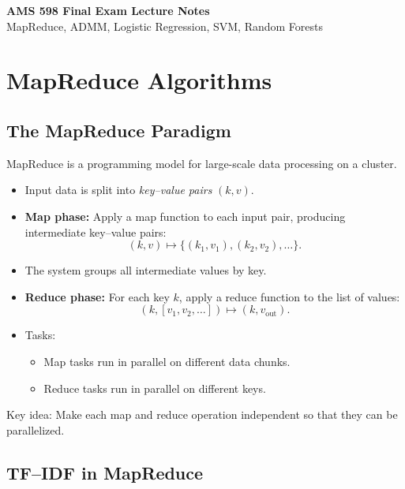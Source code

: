 \documentclass[11pt]{article}
\begin{document}
\begin{center}
    {\LARGE \textbf{AMS 598 Final Exam Lecture Notes}}\\[0.3cm]
    {\large MapReduce, ADMM, Logistic Regression, SVM, Random Forests}\\[0.2cm]
\end{center}

\tableofcontents
\newpage

\section{MapReduce Algorithms}

\subsection{The MapReduce Paradigm}

MapReduce is a programming model for large-scale data processing on a cluster.

\begin{itemize}
    \item Input data is split into \emph{key--value pairs} $(k, v)$.
    \item \textbf{Map phase:} Apply a map function to each input pair, producing intermediate key--value pairs:
    \[
        (k, v) \mapsto \{(k_1, v_1), (k_2, v_2), \dots\}.
    \]
    \item The system groups all intermediate values by key.
    \item \textbf{Reduce phase:} For each key $k$, apply a reduce function to the list of values:
    \[
        (k, [v_1, v_2, \dots]) \mapsto (k, v_{\text{out}}).
    \]
    \item Tasks:
    \begin{itemize}
        \item Map tasks run in parallel on different data chunks.
        \item Reduce tasks run in parallel on different keys.
    \end{itemize}
\end{itemize}

Key idea: Make each map and reduce operation independent so that they can be parallelized.

\subsection{TF--IDF in MapReduce}
\end{document}
